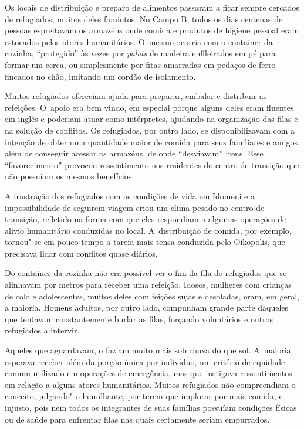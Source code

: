 Os locais de distribuição e preparo de alimentos passaram a ficar sempre
cercados de refugiados, muitos deles famintos. No Campo B, todos os dias
centenas de pessoas espreitavam os armazéns onde comida e produtos de
higiene pessoal eram estocados pelos atores humanitários. O~mesmo
ocorria com o container da cozinha, ``protegido'' às vezes por
\emph{palets} de madeira enfileirados em pé para formar um cerca, ou
simplesmente por fitas amarradas em pedaços de ferro fincados no chão,
imitando um cordão de isolamento.

Muitos refugiados ofereciam ajuda para preparar, embalar e distribuir as
refeições. O~apoio era bem vindo, em especial porque alguns deles eram
fluentes em inglês e poderiam atuar como intérpretes, ajudando na
organização das filas e na solução de conflitos. Os refugiados, por
outro lado, se disponibilizavam com a intenção de obter uma quantidade
maior de comida para seus familiares e amigos, além de conseguir acessar
os armazéns, de onde ``desviavam'' itens. Esse ``favorecimento''
provocou ressentimento nos residentes do centro de transição que não
possuíam os mesmos benefícios.

A frustração dos refugiados com as condições de vida em Idomeni e a
impossibilidade de seguirem viagem criou um clima pesado no centro de
transição, refletido na forma com que eles respondiam a algumas
operações de alívio humanitário conduzidas no local. A~distribuição de
comida, por exemplo, tornou"-se em pouco tempo a tarefa mais tensa
conduzida pelo Oikopolis, que precisava lidar com conflitos quase
diários.


Do container da cozinha não era possível ver o fim da fila de refugiados
que se alinhavam por metros para receber uma refeição. Idosos, mulheres
com crianças de colo e adolescentes, muitos deles com feições sujas e
desoladas, eram, em geral, a maioria. Homens adultos, por outro lado,
compunham grande parte daqueles que tentavam constantemente burlar as filas,
forçando voluntários e outros refugiados a intervir.

Aqueles que aguardavam, o faziam muito mais sob chuva do que sol.
A~maioria esperava receber além da porção única por indivíduo, um
critério de equidade comum utilizado em operações de emergência, mas que
instigava ressentimentos em relação a alguns atores humanitários. Muitos
refugiados não compreendiam o conceito, julgando"-o humilhante, por terem
que implorar por mais comida, e injusto, pois nem todos os integrantes de
suas famílias possuíam condições físicas ou de saúde para enfrentar
filas nas quais certamente seriam empurrados.

